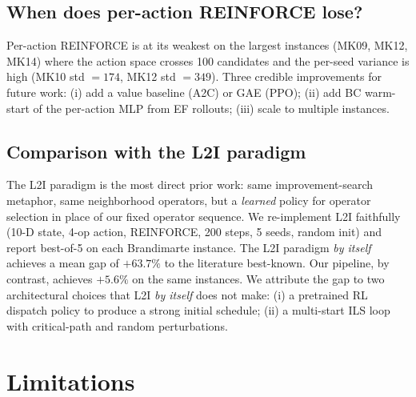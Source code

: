 \documentclass[preprint,review,3p,times,twocolumn]{elsarticle}
\begin{document}
\subsection{When does per-action REINFORCE lose?}

Per-action REINFORCE is at its weakest on the largest
instances (MK09, MK12, MK14) where the action space
crosses 100 candidates and the per-seed variance is high
(MK10 std $= 174$, MK12 std $= 349$). Three credible
improvements for future work: (i) add a value baseline
(A2C) or GAE (PPO); (ii) add BC warm-start of the
per-action MLP from EF rollouts; (iii) scale to multiple
instances.

\subsection{Comparison with the L2I paradigm}

The L2I paradigm \citep{Zhang2024L2I} is the most direct
prior work: same improvement-search metaphor, same
neighborhood operators, but a \emph{learned} policy for
operator selection in place of our fixed operator
sequence. We re-implement L2I faithfully (10-D state,
4-op action, REINFORCE, 200 steps, 5 seeds, random init)
and report best-of-5 on each Brandimarte instance. The
L2I paradigm \emph{by itself} achieves a mean gap of
$+63.7\%$ to the literature best-known. Our pipeline, by
contrast, achieves $+5.6\%$ on the same instances. We
attribute the gap to two architectural choices that L2I
\emph{by itself} does not make: (i) a pretrained RL
dispatch policy to produce a strong initial schedule;
(ii) a multi-start ILS loop with critical-path and random
perturbations.

\section{Limitations}
\label{sec:lim}
\end{document}
